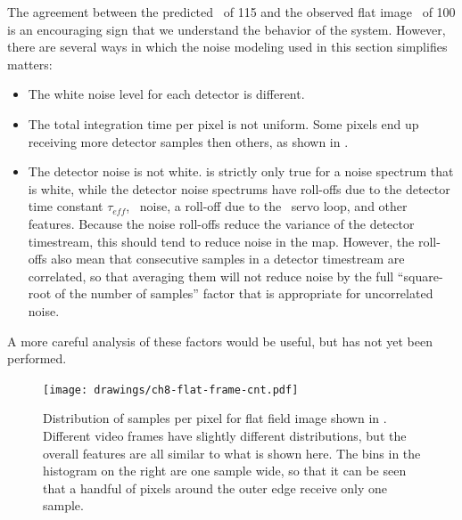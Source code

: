The agreement between the predicted \NETD\ of \SI{115}{\mK} and the observed flat image \NETD\ of \SI{100}{\mK} is an encouraging sign that we understand the behavior of the system.
However, there are several ways in which the noise modeling used in this section simplifies matters:
\begin{itemize}
\item The white noise level for each detector is different.
\item The total integration time per pixel is not uniform.
      Some pixels end up receiving more detector samples then others, as shown in .
\item The detector noise is not white.
       is strictly only true for a noise spectrum that is white, while the detector noise spectrums have roll-offs due to the detector time constant $\tau_{eff}$, \SQUID\ noise, a roll-off due to the \SQUID\ servo loop, and other features.
      Because the noise roll-offs reduce the variance of the detector timestream, this should tend to reduce noise in the map.
      However, the roll-offs also mean that consecutive samples in a detector timestream are correlated, so that averaging them will not reduce noise by the full ``square-root of the number of samples'' factor that is appropriate for uncorrelated noise.
\end{itemize}
A more careful analysis of these factors would be useful, but has not yet been performed.

\begin{figure}
\centering
\texttt{[image: drawings/ch8-flat-frame-cnt.pdf]}
\caption[Samples per pixel in image]{
  Distribution of samples per pixel for flat field image shown in .
  Different video frames have slightly different distributions, but the overall features are all similar to what is shown here.
  The bins in the histogram on the right are one sample wide, so that it can be seen that a handful of pixels around the outer edge receive only one sample.
}
\label{fig:ch8-flat-frame-cnt}
\end{figure}


